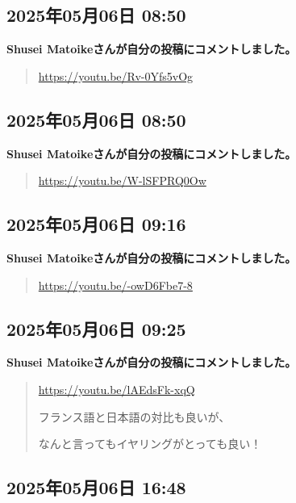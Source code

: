 \subsection*{2025年05月06日 08:50}

\textbf{Shusei Matoikeさんが自分の投稿にコメントしました。}

\begin{quote}
\url{https://youtu.be/Rv-0Yfs5vOg}
\end{quote}

\subsection*{2025年05月06日 08:50}

\textbf{Shusei Matoikeさんが自分の投稿にコメントしました。}

\begin{quote}
\url{https://youtu.be/W-lSFPRQ0Ow}
\end{quote}

\subsection*{2025年05月06日 09:16}

\textbf{Shusei Matoikeさんが自分の投稿にコメントしました。}

\begin{quote}
\url{https://youtu.be/-owD6Fbe7-8}
\end{quote}

\subsection*{2025年05月06日 09:25}

\textbf{Shusei Matoikeさんが自分の投稿にコメントしました。}

\begin{quote}
\url{https://youtu.be/lAEdsFk-xqQ}

フランス語と日本語の対比も良いが、

なんと言ってもイヤリングがとっても良い！
\end{quote}

\subsection*{2025年05月06日 16:48}

